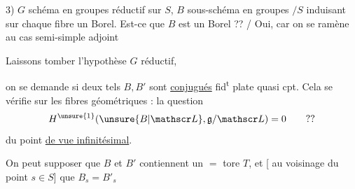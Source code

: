 3) $G$ schéma en groupes réductif sur $S$, $B$ sous-schéma en groupes $/S$ induisant sur chaque fibre un Borel. Est-ce que $B$ est un Borel ?? / Oui, car on se ramène au cas semi-simple adjoint


Laissons tomber l'hypothèse $G$ réductif,

 on se demande si deux tels $B,B'$ sont  \uline{conjugués}   fid\textsuperscript{t} plate quasi cpt. Cela se vérifie sur les fibres géométriques : la question
\[
H^{\unsure{1}}(\unsure{B|\mathscr L},\mathfrak g/\mathscr L)=0\qquad??
\]
du point \uline{de vue infinitésimal}.

On peut supposer que $B$ et $B'$ contiennent un $=$ tore $T$, et [  au voisinage du point $s\in S$] que $B_s=B'_s$

